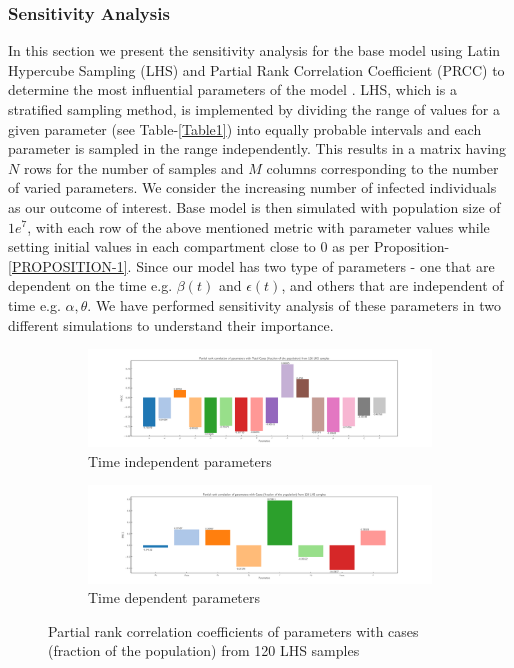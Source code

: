 \documentclass[10pt]{wlscirep}
\begin{document}
\subsubsection*{Sensitivity Analysis}
In this section we present the sensitivity analysis for the base model using Latin Hypercube Sampling (LHS) and Partial Rank Correlation Coefficient (PRCC) to determine the most influential parameters of the model \cite{Marino2008}. LHS, which is a stratified sampling method, is implemented by dividing the range of values for a given parameter (see Table-\ref{Table1}) into equally probable intervals and each parameter is sampled in the range independently. This results in a matrix having $N$ rows for the number of samples and $M$ columns corresponding to the number of varied parameters. We consider the increasing number of infected individuals as our outcome of interest. Base model is then simulated with population size of $1e^7$, with each row of the above mentioned metric with parameter values while setting initial values in each compartment close to 0 as per Proposition-\ref{PROPOSITION-1}. Since our model has two type of parameters - one that are dependent on the time e.g. $\beta(t)$ and $\epsilon(t)$, and others that are independent of time e.g. $\alpha, \theta$. We have performed sensitivity analysis of these parameters in two different simulations to understand their importance.
%
\begin{figure}[t!]
	\centering
	\begin{subfigure}{\linewidth}
		\centering
		\includegraphics[width=0.7\linewidth]{model_sensitivity_a.pdf}
		\caption{Time independent parameters}
		\label{fig-sensitivity-A}
	\end{subfigure}

	\begin{subfigure}{\linewidth}
		\centering
		\includegraphics[width=0.7\linewidth]{model_sensitivity_b.pdf}
		\caption{Time dependent parameters }
		\label{fig-sensitivity-B}
	\end{subfigure}
	\caption{Partial rank correlation coefficients of parameters  with cases (fraction of the population) from 120 LHS samples}
	\label{fig-sensitivity}
\end{figure}
\end{document}

